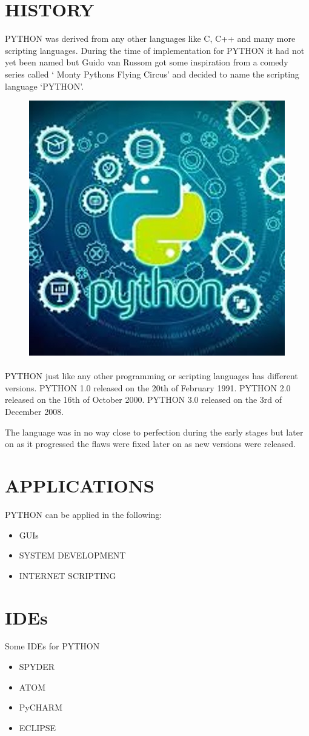 \documentclass{article}
\begin{document}
	\section{HISTORY}
	PYTHON was derived from any other languages like C, C++ and many more scripting languages.
	During the time of implementation for PYTHON it had not yet been named but Guido van Russom got some inspiration from a comedy series called ‘ Monty Pythons Flying Circus’ and decided to name the scripting language ‘PYTHON’.
	\begin{figure}
		\includegraphics{"PYTHON"}
	\end{figure}
\paragraph{}PYTHON just like any other programming or scripting languages has different versions.
PYTHON 1.0 released on the 20th of February 1991.
PYTHON 2.0 released on the 16th of October 2000.
PYTHON 3.0 released on the 3rd of December 2008.

The language was in no way close to perfection during the early stages but later on as it progressed the flaws were fixed later on as new versions were released.
\section{APPLICATIONS}
PYTHON can be applied in the following:
\begin{itemize}
	\item GUIs
	\item SYSTEM DEVELOPMENT
	\item INTERNET SCRIPTING
\end{itemize}
\section{IDEs}
Some IDEs for PYTHON
\begin{itemize}
	\item SPYDER
	\item ATOM
	\item PyCHARM
	\item ECLIPSE
\end{itemize} 
\end{document}
